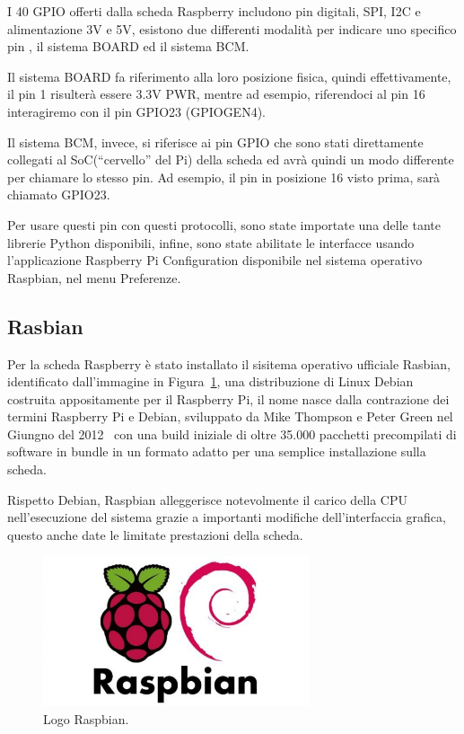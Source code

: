 I 40 GPIO offerti dalla scheda Raspberry includono pin digitali, SPI, I2C e alimentazione 3V e 5V, esistono due differenti modalità per indicare uno specifico pin , il 
sistema BOARD ed il sistema BCM.

Il sistema BOARD fa riferimento alla loro posizione fisica, quindi effettivamente, il pin 1 risulterà essere 3.3V PWR, mentre ad esempio, riferendoci al pin 16 interagiremo 
con il pin GPIO23 (GPIO\textunderscore GEN4).

Il sistema BCM, invece,  si riferisce ai pin GPIO che sono stati direttamente collegati al SoC(``cervello'' del Pi) della scheda ed avrà quindi un modo 
differente per chiamare lo stesso pin. Ad esempio, il pin in posizione 16 visto prima, sarà chiamato GPIO23.

Per usare questi pin con questi protocolli, sono state importate una delle tante librerie Python disponibili, infine, sono state abilitate le interfacce usando l’applicazione 
Raspberry Pi Configuration disponibile nel sistema operativo Raspbian, nel menu Preferenze.


\subsection{Rasbian}
Per la scheda Raspberry è stato installato il sisitema operativo ufficiale Rasbian, identificato dall'immagine in Figura~\ref{photo_raspbian}, una 
distribuzione di Linux Debian costruita appositamente per il Raspberry Pi, il nome nasce dalla contrazione dei termini Raspberry Pi e Debian, sviluppato da 
Mike Thompson e Peter Green nel Giungno del 2012~\cite{stroyOFraspberry_Raspbian} con una build iniziale di oltre 35.000 pacchetti precompilati di software in bundle
in un formato adatto per una semplice installazione sulla scheda.

Rispetto Debian, Raspbian alleggerisce notevolmente il carico della CPU nell'esecuzione del sistema grazie a importanti modifiche dell'interfaccia grafica, questo 
anche date le limitate prestazioni della scheda. 
\begin{figure}[htb]
    \centering
    \includegraphics[width=0.7\textwidth]{images/raspbian.png}
    \caption{Logo Raspbian.}
    \label{photo_raspbian}
\end{figure}

